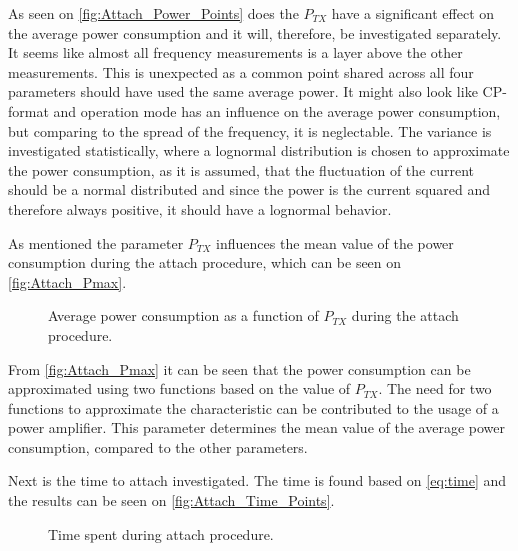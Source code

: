 As seen on \autoref{fig:Attach_Power_Points} does the $P_{TX}$ have a significant effect on the average power consumption and it will, therefore, be investigated separately. It seems like almost all frequency measurements is a layer above the other measurements. This is unexpected as a common point shared across all four parameters should have used the same average power. It might also look like CP-format and operation mode has an influence on the average power consumption, but comparing to the spread of the frequency, it is neglectable. The variance is investigated statistically, where a lognormal distribution is chosen to approximate the power consumption, as it is assumed, that the fluctuation of the current should be a normal distributed and since the power is the current squared and therefore always positive, it should have a lognormal behavior.  

As mentioned the parameter $P_{TX}$ influences the mean value of the power consumption during the attach procedure, which can be seen on \autoref{fig:Attach_Pmax}. 

\begin{figure}[H]
\centering
{}
\resizebox{0.7\textwidth}{!}{
}
\caption{Average power consumption as a function of $P_{TX}$ during the attach procedure.}
\label{fig:Attach_Pmax}
\end{figure}

From \autoref{fig:Attach_Pmax} it can be seen that the power consumption can be approximated using two functions based on the value of $P_{TX}$. The need for two functions to approximate the characteristic can be contributed to the usage of a power amplifier. This parameter determines the mean value of the average power consumption, compared to the other parameters. 

Next is the time to attach investigated. The time is found based on \autoref{eq:time} and the results can be seen on \autoref{fig:Attach_Time_Points}.


\begin{figure}[H]
\centering
\begin{minipage}{0.48\textwidth}
\resizebox{\textwidth}{!}{
}
\end{minipage}
\hfill
\begin{minipage}{0.48\textwidth}
\resizebox{\textwidth}{!}{
}
\end{minipage}
\caption{Time spent during attach procedure.}
\label{fig:Attach_Time_Points}
\end{figure}

